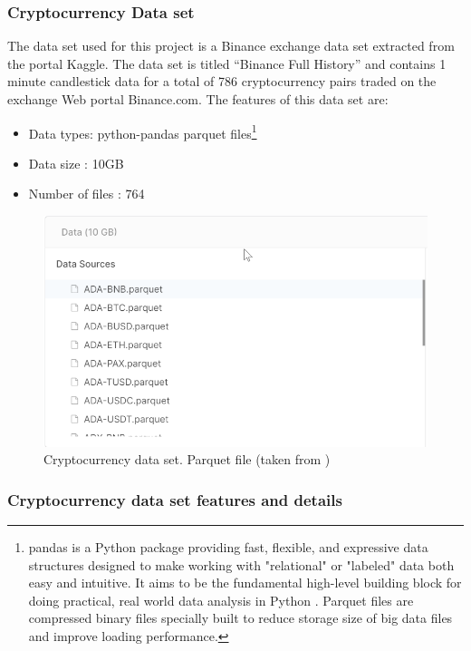 \subsubsection{Cryptocurrency Data set}

The data set used for this project is a Binance exchange data set extracted from the portal Kaggle\cite{smit_binance_2020}. The data set is titled “Binance Full History” and contains 1 minute candlestick data for a total of 786 cryptocurrency pairs traded on the exchange Web portal Binance.com\cite{binance_bitcoin_2020}. 
The features of this data set are:
\begin{itemize}
    \item Data types: python-pandas parquet files\footnote{pandas is a Python package providing fast, flexible, and expressive data structures designed to make working with "relational" or "labeled" data both easy and intuitive. It aims to be the fundamental high-level building block for doing practical, real world data analysis in Python \cite{noauthor_pandas_2020}. Parquet files are compressed binary files specially built to reduce storage size of big data files and improve loading performance.}
    \item Data size : 10GB
    \item Number of files : 764
\end{itemize}

\begin{figure}[H]
   \centering
   \includegraphics[width=\linewidth]{fig/CryptocurrencyDataSetParquetFiles.png}
    \caption{Cryptocurrency data set. Parquet file (taken from \cite{smit_binance_2020})}
    \label{fig:CryptoCurrencyDatasetParquet}
\end{figure}

\subsubsection{Cryptocurrency data set features and details}

